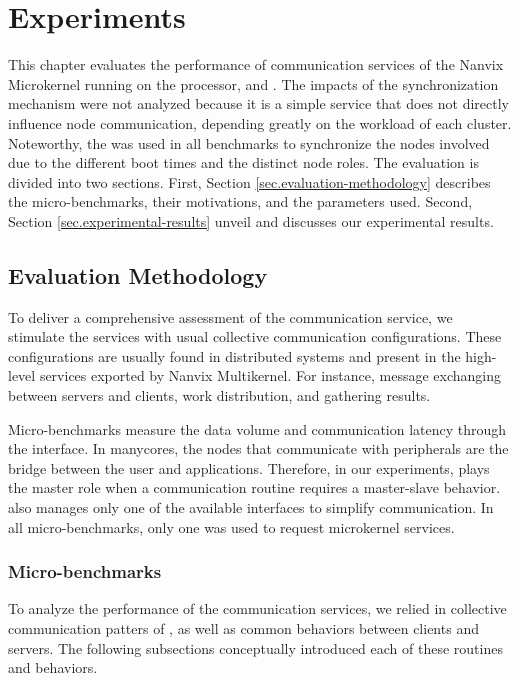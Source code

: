 \chapter{Experiments}
\label{ch.experiments}

	This chapter evaluates the performance of communication services of
	the Nanvix Microkernel running on the \mppa processor, \ie \mailbox
	and \portal. The impacts of the synchronization mechanism were not
	analyzed because it is a simple service that does not directly
	influence node communication, depending greatly on the workload of
	each cluster. Noteworthy, the \sync was used in all benchmarks to
	synchronize the nodes involved due to the different boot times and
	the distinct node roles. The evaluation is divided into two sections.
	First, Section \autoref{sec.evaluation-methodology} describes the
	micro-benchmarks, their motivations, and the parameters used. Second,
	Section \autoref{sec.experimental-results} unveil and discusses our
	experimental results.

	\section{Evaluation Methodology}
	\label{sec.evaluation-methodology}

		To deliver a comprehensive assessment of the communication service, we
		stimulate the services with usual collective communication configurations.
		These configurations are usually found in distributed systems and present
		in the high-level services exported by Nanvix Multikernel. For instance,
		message exchanging between servers and clients, work distribution, and
		gathering results.

        Micro-benchmarks measure the data volume and communication latency
		through the \ioctl interface. In manycores, the nodes that communicate
		with peripherals are the bridge between the user and applications.
		Therefore, in our experiments, \iocluster plays the master role when a
		communication routine requires a master-slave behavior. \ioclusters also
		manages only one of the available interfaces to simplify communication.
		In all micro-benchmarks, only one \pe was used to request microkernel
		services.

		\subsection{Micro-benchmarks}

			To analyze the performance of the communication services, we
			relied in collective communication patters of \mpi, as well as
			common behaviors between clients and servers. The following
			subsections conceptually introduced each of these routines and
			behaviors.

